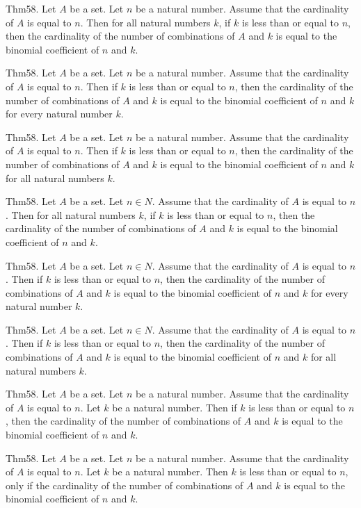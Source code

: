 \documentclass{article}
\begin{document}
Thm58. Let $A$ be a set. Let $n$ be a natural number. Assume that the cardinality of $A$ is equal to $n$. Then for all natural numbers $k$, if $k$ is less than or equal to $n$, then the cardinality of the number of combinations of $A$ and $k$ is equal to the binomial coefficient of $n$ and $k$.

Thm58. Let $A$ be a set. Let $n$ be a natural number. Assume that the cardinality of $A$ is equal to $n$. Then if $k$ is less than or equal to $n$, then the cardinality of the number of combinations of $A$ and $k$ is equal to the binomial coefficient of $n$ and $k$ for every natural number $k$.

Thm58. Let $A$ be a set. Let $n$ be a natural number. Assume that the cardinality of $A$ is equal to $n$. Then if $k$ is less than or equal to $n$, then the cardinality of the number of combinations of $A$ and $k$ is equal to the binomial coefficient of $n$ and $k$ for all natural numbers $k$.

Thm58. Let $A$ be a set. Let $n \in N$. Assume that the cardinality of $A$ is equal to $n$. Then for all natural numbers $k$, if $k$ is less than or equal to $n$, then the cardinality of the number of combinations of $A$ and $k$ is equal to the binomial coefficient of $n$ and $k$.

Thm58. Let $A$ be a set. Let $n \in N$. Assume that the cardinality of $A$ is equal to $n$. Then if $k$ is less than or equal to $n$, then the cardinality of the number of combinations of $A$ and $k$ is equal to the binomial coefficient of $n$ and $k$ for every natural number $k$.

Thm58. Let $A$ be a set. Let $n \in N$. Assume that the cardinality of $A$ is equal to $n$. Then if $k$ is less than or equal to $n$, then the cardinality of the number of combinations of $A$ and $k$ is equal to the binomial coefficient of $n$ and $k$ for all natural numbers $k$.

Thm58. Let $A$ be a set. Let $n$ be a natural number. Assume that the cardinality of $A$ is equal to $n$. Let $k$ be a natural number. Then if $k$ is less than or equal to $n$, then the cardinality of the number of combinations of $A$ and $k$ is equal to the binomial coefficient of $n$ and $k$.

Thm58. Let $A$ be a set. Let $n$ be a natural number. Assume that the cardinality of $A$ is equal to $n$. Let $k$ be a natural number. Then $k$ is less than or equal to $n$, only if the cardinality of the number of combinations of $A$ and $k$ is equal to the binomial coefficient of $n$ and $k$.
\end{document}
